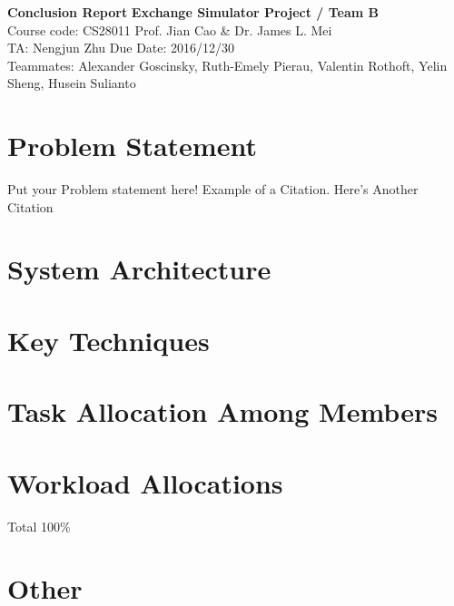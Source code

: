 \documentclass[a4paper, 11pt]{article}
\begin{document}
\noindent

\large\textbf{Conclusion Report} 
\hfill \textbf{Exchange Simulator Project / Team B} \\

\normalsize Course code: CS28011 \hfill Prof. Jian Cao \& Dr. James L. Mei\\ 

TA: Nengjun Zhu  \hfill Due Date: 2016/12/30 \\

Teammates: Alexander Goscinsky,
Ruth-Emely Pierau,
Valentin Rothoft,
Yelin Sheng,
Husein Sulianto



\section*{Problem Statement}
Put your Problem statement here! Example of a Citation\cite[p.219]{Robotics}. Here's Another Citation\cite{Flueck}

\section*{System Architecture}
\lipsum[2]

\section*{Key Techniques}
\lipsum[3]

\section*{Task Allocation Among Members}
\lipsum[4]

\section*{Workload Allocations}
Total 100\% \\
\lipsum[5]

\section*{Other}
\lipsum[7]
\end{document}
